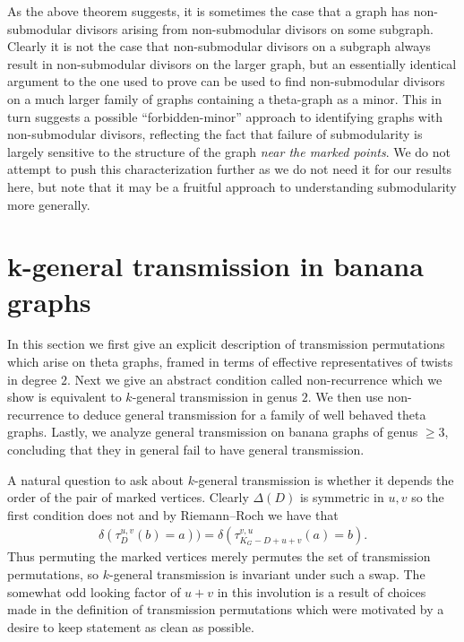 \begin{rema}
    As the above theorem suggests, it is sometimes the case that a graph has non-submodular divisors arising from non-submodular divisors on some subgraph. Clearly it is not the case that non-submodular divisors on a subgraph always result in non-submodular divisors on the larger graph, but an essentially identical argument to the one used to prove  can be used to find non-submodular divisors on a much larger family of graphs containing a theta-graph as a minor. This in turn suggests a possible ``forbidden-minor'' approach to identifying graphs with non-submodular divisors, reflecting the fact that failure of submodularity is largely sensitive to the structure of the graph \textit{near the marked points}. We do not attempt to push this characterization further as we do not need it for our results here, but note that it may be a fruitful approach to understanding submodularity more generally.
\end{rema}

\section{k-general transmission in banana graphs}\label{sec:kgt}

In this section we first give an explicit description of transmission permutations which arise on theta graphs, framed in terms of effective representatives of twists in degree $2$. Next we give an abstract condition called non-recurrence which we show is equivalent to $k$-general transmission in genus $2$. We then use non-recurrence to deduce general transmission for a family of well behaved theta graphs. Lastly, we analyze general transmission on banana graphs of genus $\geq 3$, concluding that they in general fail to have general transmission.

\begin{rema}\label{rem-PermInvol}
    A natural question to ask about $k$-general transmission is whether it depends the order of the pair of marked vertices. Clearly $\Delta(D)$ is symmetric in $u,v$ so the first condition does not and by Riemann--Roch we have that
    \begin{align*}
        \delta(\tau_D^{u,v}(b) = a)) = \delta(\tau_{K_G-D+u+v}^{v,u}(a) = b).
    \end{align*}
    Thus permuting the marked vertices merely permutes the set of transmission permutations, so $k$-general transmission is invariant under such a swap. The somewhat odd looking factor of $u+v$ in this involution is a result of choices made in the definition of transmission permutations which were motivated by a desire to keep statement \cite[Theorem 3.11]{Pfl22} as clean as possible. 
\end{rema}

